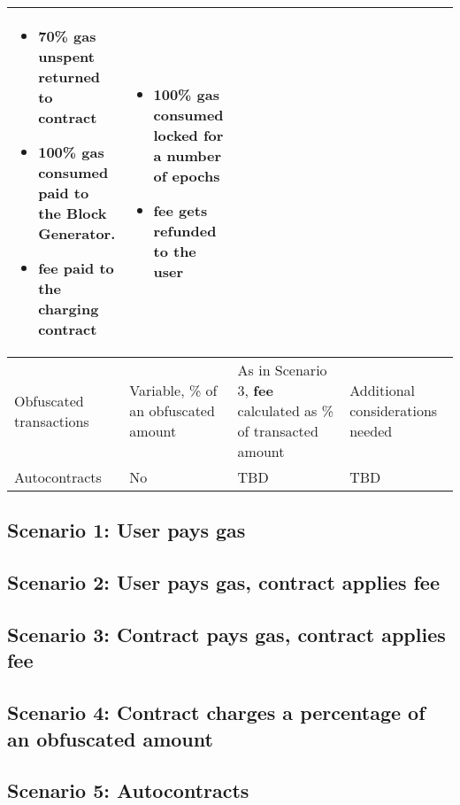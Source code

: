 \documentclass[twocolumn, nofootinbib]{revtex4-2}
\begin{document}
\begin{table*}[t]
\begin{tabular}{|m{0.15\linewidth}|m{0.1\linewidth}|m{0.45\linewidth}|m{0.3\linewidth}|}
\begin{itemize}
            \item 70\% \textbf{gas unspent} returned to contract
            \item 100\% \textbf{gas consumed} paid to the Block Generator.
            \item \textbf{fee} paid to the charging contract
        \end{itemize} &
        \begin{itemize}
            \item 100\% \textbf{gas consumed} locked for a number of epochs
            \item \textbf{fee} gets refunded to the \textbf{user}
        \end{itemize} \\
        \hline
        Obfuscated transactions & Variable, \% of an obfuscated amount & As in
        Scenario 3, \textbf{fee} calculated as \% of transacted amount &
        Additional considerations needed \\
        \hline
        Autocontracts & No & TBD & TBD \\
        \hline
    \end{tabular}
    \end{table*}

    \subsection{Scenario 1: User pays gas}\label{subsec:scenario-1}
    \subsection{Scenario 2: User pays gas, contract applies fee}\label{subsec:scenario-2}
    \subsection{Scenario 3: Contract pays gas, contract applies fee}\label{subsec:scenario-3}
    \subsection{Scenario 4: Contract charges a percentage of an obfuscated amount}\label{subsec:scenario-4}
    \subsection{Scenario 5: Autocontracts}\label{subsec:scenario-5}
\end{document}
